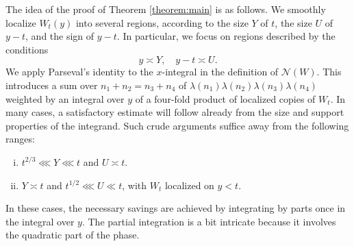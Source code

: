 \documentclass[reqno]{amsart} 
\begin{document}
The idea of the proof of Theorem \ref{theorem:main} is as follows.  We smoothly localize $W_t(y)$ into several regions, according to the size $Y$ of $t$, the size $U$ of $y - t$, and the sign of $y - t$.  In particular, we focus on regions described by the conditions
\begin{equation*}
  y \asymp Y, \quad y - t \asymp U.
\end{equation*}
We apply Parseval's identity to the $x$-integral in the definition of $\mathcal{N}(W)$.  This introduces a sum over $n_1 + n_2 = n_3 + n_4$ of $\lambda(n_1) \lambda (n _2 )  \lambda (n _3 ) \lambda (n _4 )$ weighted by an integral over $y$ of a four-fold product of localized copies of $W_t$.  In many cases, a satisfactory estimate will follow already from the size and support properties of the integrand.  Such crude arguments suffice away from the following ranges:
\begin{enumerate}[(i)]
\item $t ^{2/3}  \lll Y \lll t$ and $U \asymp t$.
\item $Y \asymp t$ and $t ^{1/2} \lll U \ll t$, with $W_t$ localized on $y < t$.
\end{enumerate} 
In these cases, the necessary savings are achieved by integrating by parts once in the integral over $y$.  The partial integration is a bit intricate because it involves the quadratic part of the phase.
\end{document}
